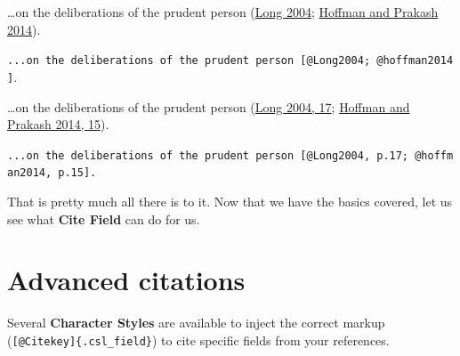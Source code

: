 \documentclass[
  12pt,
  a4paper,
  oneside,
  numbers=noenddot,
  titlepage,
  toclink=all,
  toc=bibliography]{scrbook}
\theoremstyle{definition}
\theoremstyle{definition}
\theoremstyle{definition}
\theoremstyle{plain}
\theoremstyle{plain}
\theoremstyle{plain}
\theoremstyle{plain}
\theoremstyle{plain}
\theoremstyle{remark}
\begin{document}
\begin{tcolorbox}[enhanced jigsaw, rightrule=.15mm, bottomtitle=1mm, colback=white, toptitle=1mm, left=2mm, colbacktitle=quarto-callout-note-color!10!white, opacitybacktitle=0.6, opacityback=0, arc=.35mm, leftrule=.75mm, toprule=.15mm, titlerule=0mm, breakable, coltitle=black, bottomrule=.15mm, colframe=quarto-callout-note-color-frame, title=\textcolor{quarto-callout-note-color}{\faInfo}\hspace{0.5em}{(Author, Date; Author, Date)}]

\ldots on the deliberations of the prudent person
\protect\hypertarget{cite_107}{}{\label{cite_107}(\protect\hyperlink{ref-Long2004}{Long
2004}; \protect\hyperlink{ref-hoffman2014}{Hoffman and Prakash 2014})}.

\texttt{...on\ the\ deliberations\ of\ the\ prudent\ person\ {[}@Long2004;\ @hoffman2014{]}}.

\ldots on the deliberations of the prudent person
\protect\hypertarget{cite_108}{}{\label{cite_108}(\protect\hyperlink{ref-Long2004}{Long
2004, 17}; \protect\hyperlink{ref-hoffman2014}{Hoffman and Prakash 2014,
15})}.

\texttt{...on\ the\ deliberations\ of\ the\ prudent\ person\ {[}@Long2004,\ p.17;\ @hoffman2014,\ p.15{]}.}

\end{tcolorbox}

That is pretty much all there is to it. Now that we have the basics
covered, let us see what \textbf{Cite Field} can do for us.

\hypertarget{sec-scriv44}{%
\section{Advanced citations}\label{sec-scriv44}}

\begin{tcolorbox}[enhanced jigsaw, rightrule=.15mm, bottomtitle=1mm, colback=white, toptitle=1mm, left=2mm, colbacktitle=quarto-callout-note-color!10!white, opacitybacktitle=0.6, opacityback=0, arc=.35mm, leftrule=.75mm, toprule=.15mm, titlerule=0mm, breakable, coltitle=black, bottomrule=.15mm, colframe=quarto-callout-note-color-frame, title=\textcolor{quarto-callout-note-color}{\faInfo}\hspace{0.5em}{TLDR}]

Several \textbf{Character Styles} are available to inject the correct
markup (\texttt{{[}@Citekey{]}\{.csl\_field\}}) to cite specific fields
from your references.

\end{tcolorbox}
\end{document}
